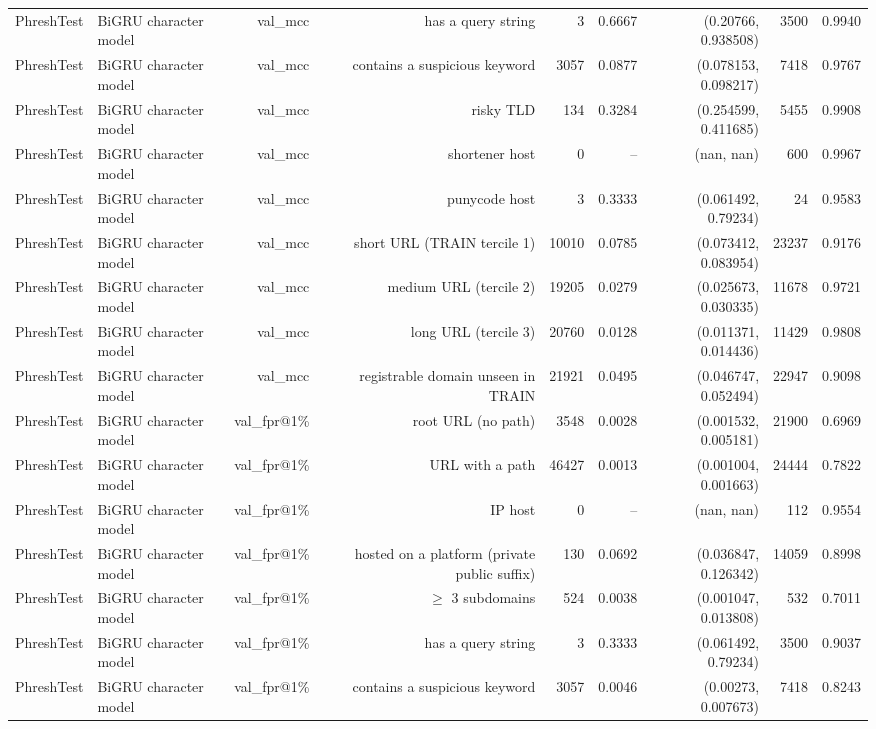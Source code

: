 \begin{table}[t]
\begin{tabular}{llrrrrrrr}
PhreshTest & BiGRU character model & val\_mcc & has a query string & 3 & 0.6667 & (0.20766, 0.938508) & 3500 & 0.9940 \\
PhreshTest & BiGRU character model & val\_mcc & contains a suspicious keyword & 3057 & 0.0877 & (0.078153, 0.098217) & 7418 & 0.9767 \\
PhreshTest & BiGRU character model & val\_mcc & risky TLD & 134 & 0.3284 & (0.254599, 0.411685) & 5455 & 0.9908 \\
PhreshTest & BiGRU character model & val\_mcc & shortener host & 0 & -- & (nan, nan) & 600 & 0.9967 \\
PhreshTest & BiGRU character model & val\_mcc & punycode host & 3 & 0.3333 & (0.061492, 0.79234) & 24 & 0.9583 \\
PhreshTest & BiGRU character model & val\_mcc & short URL (TRAIN tercile 1) & 10010 & 0.0785 & (0.073412, 0.083954) & 23237 & 0.9176 \\
PhreshTest & BiGRU character model & val\_mcc & medium URL (tercile 2) & 19205 & 0.0279 & (0.025673, 0.030335) & 11678 & 0.9721 \\
PhreshTest & BiGRU character model & val\_mcc & long URL (tercile 3) & 20760 & 0.0128 & (0.011371, 0.014436) & 11429 & 0.9808 \\
PhreshTest & BiGRU character model & val\_mcc & registrable domain unseen in TRAIN & 21921 & 0.0495 & (0.046747, 0.052494) & 22947 & 0.9098 \\
PhreshTest & BiGRU character model & val\_fpr@1\% & root URL (no path) & 3548 & 0.0028 & (0.001532, 0.005181) & 21900 & 0.6969 \\
PhreshTest & BiGRU character model & val\_fpr@1\% & URL with a path & 46427 & 0.0013 & (0.001004, 0.001663) & 24444 & 0.7822 \\
PhreshTest & BiGRU character model & val\_fpr@1\% & IP host & 0 & -- & (nan, nan) & 112 & 0.9554 \\
PhreshTest & BiGRU character model & val\_fpr@1\% & hosted on a platform (private public suffix) & 130 & 0.0692 & (0.036847, 0.126342) & 14059 & 0.8998 \\
PhreshTest & BiGRU character model & val\_fpr@1\% & $\geq$ 3 subdomains & 524 & 0.0038 & (0.001047, 0.013808) & 532 & 0.7011 \\
PhreshTest & BiGRU character model & val\_fpr@1\% & has a query string & 3 & 0.3333 & (0.061492, 0.79234) & 3500 & 0.9037 \\
PhreshTest & BiGRU character model & val\_fpr@1\% & contains a suspicious keyword & 3057 & 0.0046 & (0.00273, 0.007673) & 7418 & 0.8243 \\

\end{tabular}
\end{table}
